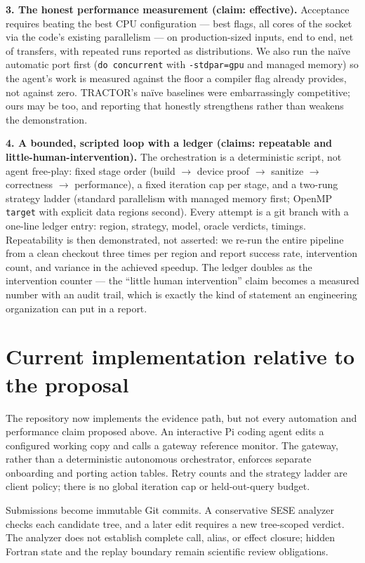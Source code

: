 \documentclass[11pt]{article}
\begin{document}
\textbf{3. The honest performance measurement (claim: effective).}
Acceptance requires beating the best CPU configuration --- best flags, all cores of the socket via the code's existing parallelism --- on production-sized inputs, end to end, net of transfers, with repeated runs reported as distributions. We also run the na\"ive automatic port first (\texttt{do concurrent} with \texttt{-stdpar=gpu} and managed memory) so the agent's work is measured against the floor a compiler flag already provides, not against zero. TRACTOR's na\"ive baselines were embarrassingly competitive; ours may be too, and reporting that honestly strengthens rather than weakens the demonstration.

\textbf{4. A bounded, scripted loop with a ledger (claims: repeatable and little-human-intervention).}
The orchestration is a deterministic script, not agent free-play: fixed stage order (build $\rightarrow$ device proof $\rightarrow$ sanitize $\rightarrow$ correctness $\rightarrow$ performance), a fixed iteration cap per stage, and a two-rung strategy ladder (standard parallelism with managed memory first; OpenMP \texttt{target} with explicit data regions second). Every attempt is a git branch with a one-line ledger entry: region, strategy, model, oracle verdicts, timings. Repeatability is then demonstrated, not asserted: we re-run the entire pipeline from a clean checkout three times per region and report success rate, intervention count, and variance in the achieved speedup. The ledger doubles as the intervention counter --- the ``little human intervention'' claim becomes a measured number with an audit trail, which is exactly the kind of statement an engineering organization can put in a report.

\section{Current implementation relative to the proposal}

The repository now implements the evidence path, but not every automation and
performance claim proposed above. An interactive Pi coding agent edits a
configured working copy and calls a gateway reference monitor. The gateway,
rather than a deterministic autonomous orchestrator, enforces separate
onboarding and porting action tables. Retry counts and the strategy ladder are
client policy; there is no global iteration cap or held-out-query budget.

Submissions become immutable Git commits. A conservative SESE analyzer checks
each candidate tree, and a later edit requires a new tree-scoped verdict. The
analyzer does not establish complete call, alias, or effect closure; hidden
Fortran state and the replay boundary remain scientific review obligations.
\end{document}
